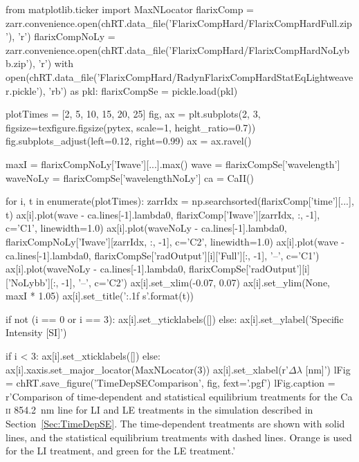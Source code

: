 
\begin{pycode}[TimeDepRT]
from matplotlib.ticker import MaxNLocator
flarixComp = zarr.convenience.open(chRT.data_file('FlarixCompHard/FlarixCompHardFull.zip'), 'r')
flarixCompNoLy = zarr.convenience.open(chRT.data_file('FlarixCompHard/FlarixCompHardNoLybb.zip'), 'r')
with open(chRT.data_file('FlarixCompHard/RadynFlarixCompHardStatEqLightweaver.pickle'), 'rb') as pkl:
    flarixCompSe = pickle.load(pkl)

plotTimes = [2, 5, 10, 15, 20, 25]
fig, ax = plt.subplots(2, 3, figsize=texfigure.figsize(pytex, scale=1, height_ratio=0.7))
fig.subplots_adjust(left=0.12, right=0.99)
ax = ax.ravel()

maxI = flarixCompNoLy['Iwave'][...].max()
wave = flarixCompSe['wavelength']
waveNoLy = flarixCompSe['wavelengthNoLy']
ca = CaII()

for i, t in enumerate(plotTimes):
    zarrIdx = np.searchsorted(flarixComp['time'][...], t)
    ax[i].plot(wave - ca.lines[-1].lambda0, flarixComp['Iwave'][zarrIdx, :, -1], c='C1', linewidth=1.0)
    ax[i].plot(waveNoLy - ca.lines[-1].lambda0, flarixCompNoLy['Iwave'][zarrIdx, :, -1], c='C2', linewidth=1.0)
    ax[i].plot(wave - ca.lines[-1].lambda0, flarixCompSe['radOutput'][i]['Full'][:, -1], '--', c='C1')
    ax[i].plot(waveNoLy - ca.lines[-1].lambda0, flarixCompSe['radOutput'][i]['NoLybb'][:, -1], '--', c='C2')
    ax[i].set_xlim(-0.07, 0.07)
    ax[i].set_ylim(None, maxI * 1.05)
    ax[i].set_title('{:.1f} s'.format(t))

    if not (i == 0 or i == 3):
        ax[i].set_yticklabels([])
    else:
        ax[i].set_ylabel('Specific Intensity [SI]')

    if i < 3:
        ax[i].set_xticklabels([])
    else:
        ax[i].xaxis.set_major_locator(MaxNLocator(3))
        ax[i].set_xlabel(r'$\Delta\lambda$ [nm]')
lFig = chRT.save_figure('TimeDepSEComparison', fig, fext='.pgf')
lFig.caption = r'Comparison of time-dependent and statistical equilibrium treatments for the Ca\,\textsc{ii} \SI{854.2}{\nano\metre} line for LI and LE treatments in the simulation described in Section~\ref{Sec:TimeDepSE}. The time-dependent treatments are shown with solid lines, and the statistical equilibrium treatments with dashed lines. Orange is used for the LI treatment, and green for the LE treatment.'
\end{pycode}

